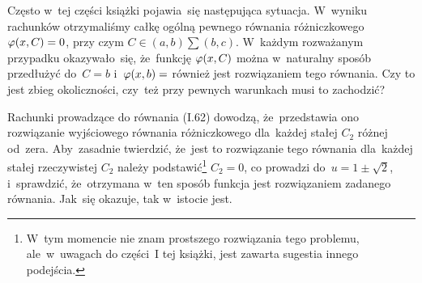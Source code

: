 \documentclass[a4paper,11pt]{article}
\begin{document}


\noi {}

\vspace{\spaceFour}


\start Często w~tej części książki pojawia~się następująca sytuacja.
W~wyniku rachunków otrzymaliśmy całkę ogólną pewnego równania
różniczkowego $\varphi( x, C ) = 0$, przy czym
$C \in ( a, b ) \sum ( b, c )$. W~każdym rozważanym przypadku
okazywało~się, że~funkcję $\varphi( x, C )$ można w~naturalny sposób
przedłużyć do~$C = b$ i~$\varphi( x, b ) = $ również jest rozwiązaniem
tego równania. Czy to jest zbieg okoliczności, czy~też przy pewnych
warunkach musi to zachodzić? \Prze

\vspace{\spaceThree}



\noi {}

\vspace{\spaceFour}


\start {} \Dok

\start {} Rachunki prowadzące do równania (I.62) dowodzą,
że~przedstawia ono rozwiązanie wyjściowego równania różniczkowego
dla~każdej stałej $C_{ 2 }$ różnej od~zera. Aby~zasadnie twierdzić,
że~jest to rozwiązanie tego równania dla~każdej stałej rzeczywistej
$C_{ 2 }$ należy podstawić\footnote{W~tym momencie nie znam prostszego
  rozwiązania tego problemu, ale~w~uwagach do części~I tej książki,
  jest zawarta sugestia innego podejścia.} $C_{ 2 } = 0$, co prowadzi
do~$u = 1 \pm \sqrt{2}$, i~sprawdzić, że~otrzymana w~ten sposób
funkcja jest rozwiązaniem zadanego równania. Jak~się okazuje, tak
w~istocie jest.

\end{document}
